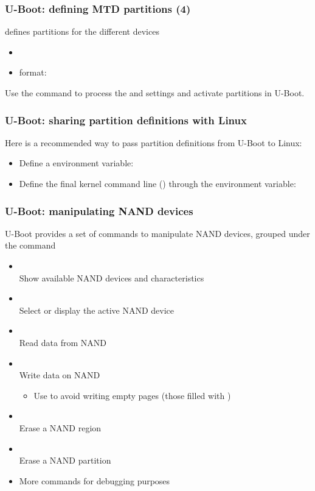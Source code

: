 \begin{frame}[fragile]
  \frametitle{U-Boot: defining MTD partitions (4)}
   defines partitions for the different devices\\
  \begin{itemize}
    \item {}
    \item {} format: 
  \end{itemize}
  Use the  command to process the  and
   settings and activate partitions in U-Boot.
\end{frame}

\begin{frame}
  \frametitle{U-Boot: sharing partition definitions with Linux}
  Here is a recommended way to pass partition definitions from U-Boot to Linux:
  \begin{itemize}
  \item Define a  environment variable:\\
  \item Define the final kernel command line ()
    through the  environment variable:
  \end{itemize}
\end{frame}

\begin{frame}
  \frametitle{U-Boot: manipulating NAND devices}
  U-Boot provides a set of commands to manipulate NAND devices,
  grouped under the  command
  \begin{itemize}
  \item {}\\
    Show available NAND devices and characteristics
  \item {}\\
    Select or display the active NAND device
  \item {}\\
    Read data from NAND
  \item {}\\
    Write data on NAND
    \begin{itemize}
      \item Use  to avoid writing empty pages
      (those filled with )
    \end{itemize}
  \item {}\\
    Erase a NAND region
  \item {}\\
    Erase a NAND partition
  \item More commands for debugging purposes
  \end{itemize}
\end{frame}

